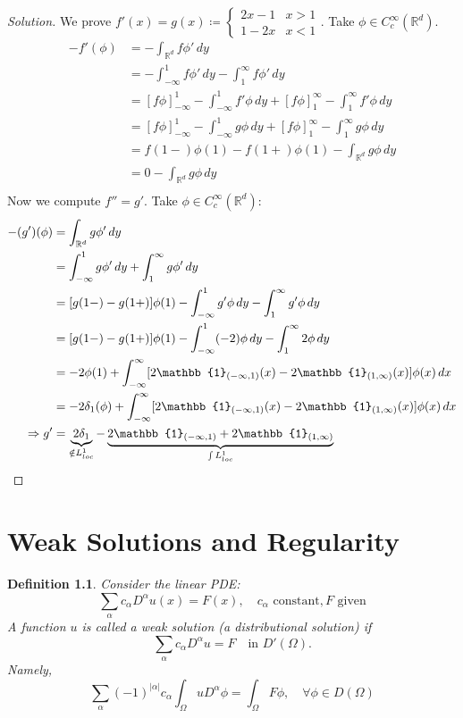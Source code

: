 \documentclass{report}
\theoremstyle{tommy}
\newtheorem{defn}{Definition}
\begin{document}
  \begin{proof}[Solution]
    We prove \(f'(x) = g(x) \coloneqq \begin{cases}
      2x - 1 & x > 1 \\  1- 2x & x < 1
    \end{cases}\). Take \(\phi \in C_c^\infty(\mathbb{R}^d)\).
    \begin{align*}
      -f'(\phi) 
      &= - \int_{\mathbb{R}^d} f \phi' \, dy \\
      &= - \int_{-\infty}^1 f \phi' \, dy - \int_1^\infty f \phi' \, dy  \\
      &= [f \phi]_{- \infty}^1 - \int_{- \infty}^1 f' \phi \, dy + [f \phi]_1^\infty - \int_1^\infty f' \phi \, dy \\
      &= [f \phi]_{- \infty}^1 - \int_{- \infty}^1 g \phi \, dy + [f \phi]_1^\infty - \int_1^\infty g \phi \, dy \\
      &= f(1-) \phi(1) - f(1+)\phi(1) - \int_{\mathbb{R}^d} g \phi \, dy \\
      &= 0  - \int_{\mathbb{R}^d} g \phi \, dy \\
    \end{align*}
    Now we compute \(f'' = g'\). Take \(\phi \in C_c^\infty(\mathbb{R}^d)\):
    \begin{align*}
      -(g')(\phi) 
      &= \int_{\mathbb{R}^d} g\phi' \, dy \\
      &= \int_{- \infty}^1  g\phi' \, dy + \int_1^\infty  g\phi' \, dy \\
      &= [g(1-) - g(1+)] \phi(1) - \int_{-\infty}^1g' \phi \, dy - \int_1^\infty g' \phi \, dy \\
      &= [g(1-) - g(1+)] \phi(1) - \int_{-\infty}^1(-2) \phi \, dy - \int_1^\infty 2 \phi \, dy \\
      &= - 2 \phi(1) + \int_{-\infty}^\infty [2 \mathbb{1}_{(-\infty, 1)}(x) - 2 \mathbb{1}_{(1,  \infty)} (x)]\phi(x) \, dx \\
      &= -2 \delta_1(\phi) + \int_{-\infty}^\infty [2 \mathbb{1}_{(-\infty, 1)}(x) - 2 \mathbb{1}_{(1,  \infty)} (x)]\phi(x) \, dx \\
      \Rightarrow g' &= \underbrace{2 \delta_1}_{\notin L_{loc}^1} - \underbrace{2 \mathbb{1}_{(-\infty, 1)} + 2 \mathbb{1}_{(1, \infty)}}_{\int L_{loc}^1} \qedhere
    \end{align*}
  \end{proof}

  \chapter{Weak Solutions and Regularity}
  \begin{defn}
    Consider the linear PDE:
    \[\sum_{\alpha} c_\alpha D^\alpha u(x) = F(x), \quad c_\alpha \text{ constant}, F \text{ given}\]
    A function \(u\) is called a weak solution (a distributional solution) if 
    \[\sum_\alpha c_\alpha D^\alpha u = F \quad \text{in } D'(\Omega).\]
    Namely,
    \[\sum_\alpha (-1)^{|\alpha|} c_\alpha \int_\Omega u D^\alpha \phi = \int_\Omega F \phi, \quad \forall \phi \in D(\Omega)\]
  \end{defn}
\end{document}
